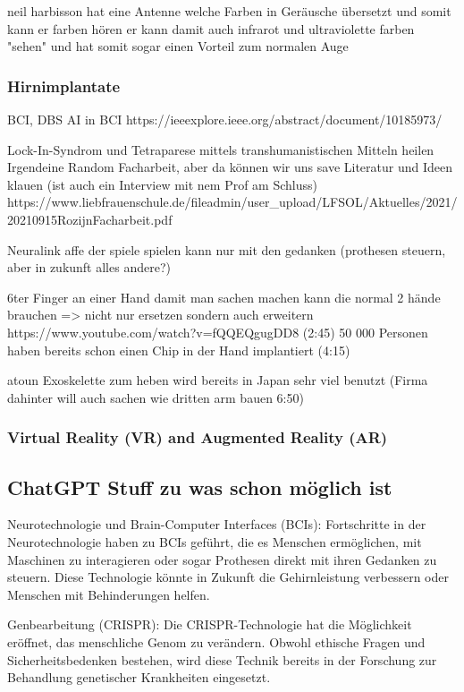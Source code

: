 \documentclass[a4paper,
DIV=13,
12pt,
BCOR=10mm,
department=FakEI,
twoside,
parskip=half,
automark,
]{OTHRartcl}
\begin{document}
neil harbisson hat eine Antenne welche Farben in Geräusche übersetzt und somit kann er farben hören er kann damit auch infrarot und ultraviolette farben "sehen" und hat somit sogar einen Vorteil zum normalen Auge
\subsubsection*{Hirnimplantate}
BCI, DBS
AI in BCI
https://ieeexplore.ieee.org/abstract/document/10185973/

Lock-In-Syndrom und Tetraparese mittels transhumanistischen Mitteln heilen
Irgendeine Random Facharbeit, aber da können wir uns save Literatur und Ideen klauen (ist auch ein Interview mit nem Prof am Schluss)
https://www.liebfrauenschule.de/fileadmin/user_upload/LFSOL/Aktuelles/2021/20210915RozijnFacharbeit.pdf

Neuralink affe der spiele spielen kann nur mit den gedanken (prothesen steuern, aber in zukunft alles andere?)

6ter Finger an einer Hand damit man sachen machen kann die normal 2 hände brauchen => nicht nur ersetzen sondern auch erweitern
https://www.youtube.com/watch?v=fQQEQgugDD8 (2:45)
50 000 Personen haben bereits schon einen Chip in der Hand implantiert (4:15)

atoun Exoskelette zum heben wird bereits in Japan sehr viel benutzt (Firma dahinter will auch sachen wie dritten arm bauen 6:50)
\subsubsection*{Virtual Reality (VR) and Augmented Reality (AR)}

\subsection*{ChatGPT Stuff zu was schon möglich ist}

Neurotechnologie und Brain-Computer Interfaces (BCIs): Fortschritte in der Neurotechnologie haben zu BCIs geführt, die es Menschen ermöglichen, mit Maschinen zu interagieren oder sogar Prothesen direkt mit ihren Gedanken zu steuern. Diese Technologie könnte in Zukunft die Gehirnleistung verbessern oder Menschen mit Behinderungen helfen.

Genbearbeitung (CRISPR): Die CRISPR-Technologie hat die Möglichkeit eröffnet, das menschliche Genom zu verändern. Obwohl ethische Fragen und Sicherheitsbedenken bestehen, wird diese Technik bereits in der Forschung zur Behandlung genetischer Krankheiten eingesetzt.
\end{document}
